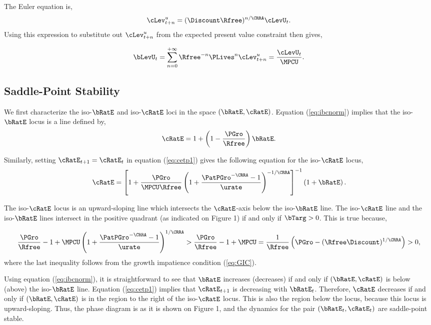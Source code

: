 \documentclass[titlepage]{\econtex}\newcommand{\texname}{cjSOE}
\begin{document}
The Euler equation is,
\begin{equation*}
\cLev_{t+n}^u=(\Discount \Rfree)^{n/\CRRA} \cLevU_{t}.
\end{equation*}
Using this expression to substitute out $\cLev^u_{t+n}$ from the expected present value constraint then gives,

\begin{equation*}
\bLevU_t = \sum_{n=0}^{+\infty} \Rfree^{-n} \PLives^{n} \cLev_{t+n}^u = \frac{\cLevU_{t}}{\MPCU}.
\end{equation*}

\subsection{Saddle-Point Stability}

We first characterize the iso-$\bRatE$ and iso-$\cRatE$ loci in the space $(\bRatE , \cRatE)$. Equation (\ref{eq:ibcnorm}) implies that the iso-$\bRatE$ locus is a line defined by,
\begin{equation*}
\cRatE = 1+\left(1-\frac{\PGro}{\Rfree} \right)\bRatE.
\end{equation*}

Similarly, setting $\cRatE_{t+1} = \cRatE_t$ in equation (\ref{eq:cetp1}) gives the following equation for the iso-$\cRatE$ locus,
\begin{equation*}
\cRatE = \left[1+\frac{\PGro}{\MPCU \Rfree}\left(1+\frac{\PatPGro^{-\CRRA}-1}{\urate}\right)^{-1/\CRRA}\right]^{-1} \left(1+ \bRatE \right).
\end{equation*}

The iso-$\cRatE$ locus is an upward-sloping line which intersects the $\cRatE$-axis below the iso-$\bRatE$ line. The iso-$\cRatE$ line and the iso-$\bRatE$ lines intersect in the positive quadrant (as indicated on Figure 1) if and only if $\bTarg > 0$. This is true because,

\begin{equation*}
\frac{\PGro}{\Rfree}-1+ \MPCU \left(1+\frac{\PatPGro^{-\CRRA}-1}{\urate}\right)^{1/\CRRA}
> \frac{\PGro}{\Rfree}-1+\MPCU = \frac{1}{\Rfree}\left(\PGro-(\Rfree \Discount)^{1/\CRRA}\right)>0,
\end{equation*}
where the last inequality follows from the growth impatience condition (\ref{eq:GIC}).

Using equation (\ref{eq:ibcnorm}), it is straightforward  to see that $\bRatE$ increases (decreases) if and only if $(\bRatE, \cRatE)$ is below (above) the iso-$\bRatE$ line. Equation (\ref{eq:cetp1}) implies that $\cRatE_{t+1}$ is decreasing with $\bRatE_t$. Therefore, $\cRatE$ decreases if and only if $(\bRatE, \cRatE)$ is in the region to the right of the iso-$\cRatE$ locus. This is also the region below the locus, because this locus is upward-sloping. Thus, the phase diagram is as it is shown on Figure 1, and the dynamics for the pair $(\bRatE _t, \cRatE_t)$ are saddle-point stable.
\end{document}
